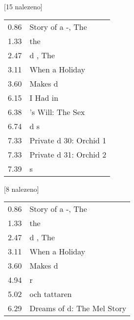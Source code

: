 \begin{table}[H]
\begin{tt}

\horizlina

\noindent
\begin{minipage}[t]{.5\textwidth}\vspace{0pt}
 [15 nalezeno]\vspace{5pt}

\begin{tabulary}{1.1\textwidth}{LL}
0.86 & Story of a -, The \\
1.33 &  the  \\
2.47 & d , The \\
3.11 & When   a Holiday \\
3.60 &  Makes d \\
6.15 & I Had  in  \\
6.38 & 's Will: The Sex  \\
6.74 & d s \\
7.33 & Private d 30:  Orchid 1 \\
7.33 & Private d 31:  Orchid 2 \\
7.39 &  s \\
\end{tabulary}
\end{minipage}
\begin{minipage}[t]{.5\textwidth}\vspace{0pt}
 [8 nalezeno]\vspace{5pt}

\begin{tabulary}{1.1\textwidth}{LL}
0.86 & Story of a -, The \\
1.33 &  the  \\
2.47 & d , The \\
3.11 & When   a Holiday \\
3.60 &  Makes d \\
4.94 &  r \\
5.02 &   och tattaren \\
6.29 & Dreams of d: The Mel  Story \\
\end{tabulary}
\end{minipage}


\end{tt}
\end{table}

